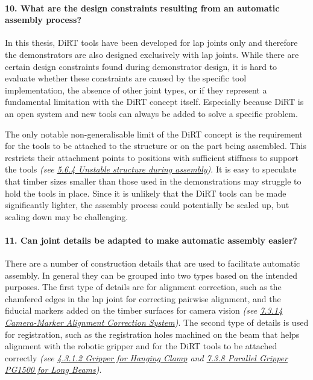 \paragraph{10. What are the design constraints resulting from an automatic assembly process?}

In this thesis, DiRT tools have been developed for lap joints only and therefore the demonstrators are also designed exclusively with lap joints. While there are certain design constraints found during demonstrator design, it is hard to evaluate whether these constraints are caused by the specific tool implementation, the absence of other joint types, or if they represent a fundamental limitation with the DiRT concept itself. Especially because DiRT is an open system and new tools can always be added to solve a specific problem.

The only notable non-generalisable limit of the DiRT concept is the requirement for the tools to be attached to the structure or on the part being assembled. This restricts their attachment points to positions with sufficient stiffness to support the tools \textit{(see \ul{5.6.4 Unstable structure during assembly})}. It is easy to speculate that timber sizes smaller than those used in the demonstrations may struggle to hold the tools in place. Since it is unlikely that the DiRT tools can be made significantly lighter, the assembly process could potentially be scaled up, but scaling down may be challenging.

\paragraph{11. Can joint details be adapted to make automatic assembly easier?}

There are a number of construction details that are used to facilitate automatic assembly. In general they can be grouped into two types based on the intended purposes. The first type of details are for alignment correction, such as the chamfered edges in the lap joint for correcting pairwise alignment, and the fiducial markers added on the timber surfaces for camera vision \textit{(see \ul{7.3.14 Camera-Marker Alignment Correction System})}. The second type of details is used for registration, such as the registration holes machined on the beam that helps alignment with the robotic gripper and for the DiRT tools to be attached correctly \textit{(see \ul{4.3.1.2 Gripper for Hanging Clamp} and \ul{7.3.8 Parallel Gripper PG1500 for Long Beams})}.

